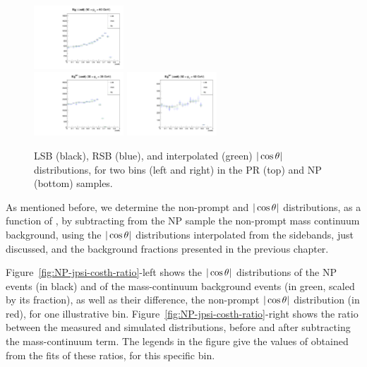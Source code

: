 \begin{figure}[h!]
\includegraphics[width=0.3\textwidth]{Figures/chapter5/SB_base_full_5-psipPR.pdf}\\
\includegraphics[width=0.3\textwidth]{Figures/chapter5/SB_base_full_2-psipNP.pdf}
\includegraphics[width=0.3\textwidth]{Figures/chapter5/SB_base_full_5-psipNP.pdf}
\caption{LSB (black), RSB (blue), and interpolated (green) $|\cos\theta|$ distributions,
for two \pt bins (left and right) in the PR (top) and NP (bottom) \psip samples.}
\label{fig:costheta-Bg-psip}
\end{figure}

\vfill\newpage

As mentioned before, 
we determine the non-prompt \jpsi and \psip $|\cos\theta|$ distributions,
as a function of \pt,
by subtracting from the NP sample the non-prompt mass continuum background, 
using the $|\cos\theta|$ distributions interpolated from the sidebands, just discussed,
and the background fractions presented in the previous chapter.

Figure~\ref{fig:NP-jpsi-costh-ratio}-left shows the $|\cos\theta|$ distributions 
of the \jpsi NP events (in black) 
and of the mass-continuum background events (in green, scaled by its fraction),
as well as their difference, the non-prompt \jpsi $|\cos\theta|$ distribution (in red), 
for one illustrative \pt bin. 
Figure~\ref{fig:NP-jpsi-costh-ratio}-right shows the ratio between the measured 
and simulated distributions, before and after subtracting the mass-continuum term.
The legends in the figure give the values of \lth obtained from the fits of these ratios,
for this specific \pt bin.

